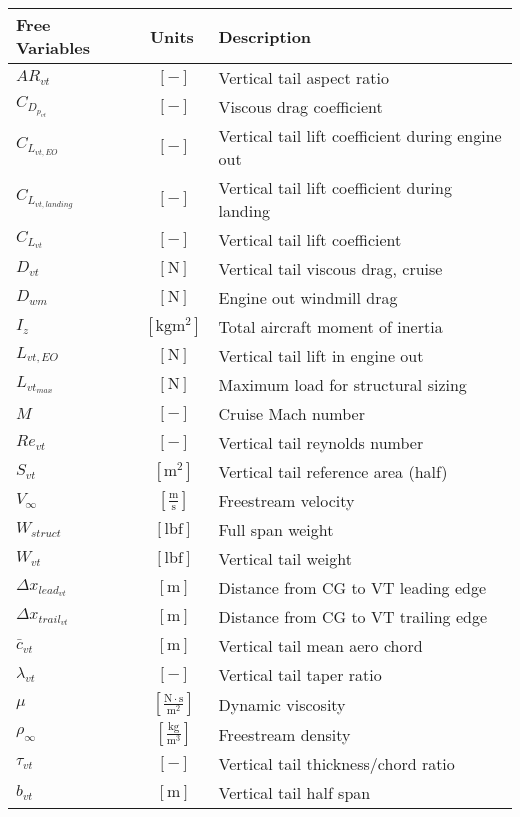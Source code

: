 \documentclass[12pt]{article}
\begin{document}
{\footnotesize
\begin{supertabular}{lcl}
\toprule
Free Variables & Units & Description \\ \midrule
$AR_{vt}$ & $~[-]$ & Vertical tail aspect ratio \\
$C_{D_{p_{vt}}}$ & $~[-]$ & Viscous drag coefficient \\
$C_{L_{vt,EO}}$ & $~[-]$ & Vertical tail lift coefficient during engine out \\
$C_{L_{vt,landing}}$ & $~[-]$ & Vertical tail lift coefficient during landing \\
$C_{L_{vt}}$ & $~[-]$ & Vertical tail lift coefficient \\
$D_{vt}$ & $~\mathrm{[N]}$ & Vertical tail viscous drag, cruise \\
$D_{wm}$ & $~\mathrm{[N]}$ & Engine out windmill drag \\
$I_{z}$ & $~\mathrm{[kg m^2]}$ & Total aircraft moment of inertia\\
$L_{vt,EO}$ & $~\mathrm{[N]}$ & Vertical tail lift in engine out \\
$L_{vt_{max}}$ & $~\mathrm{[N]}$ & Maximum load for structural sizing \\
$M$ & $~[-]$ & Cruise Mach number \\
$Re_{vt}$ & $~[-]$ & Vertical tail reynolds number\\
$S_{vt}$ & $~\mathrm{[m^{2}]}$ & Vertical tail reference area (half) \\
$V_{\infty}$ & $~\mathrm{[\tfrac{m}{s}]}$ & Freestream velocity \\
$W_{struct}$ & $~\mathrm{[lbf]}$ & Full span weight \\
$W_{vt}$ & $~\mathrm{[lbf]}$ & Vertical tail weight \\
$\Delta x_{lead_{vt}}$ & $~\mathrm{[m]}$ & Distance from CG to VT leading edge \\
$\Delta x_{trail_{vt}}$ & $~\mathrm{[m]}$ & Distance from CG to VT trailing edge \\
$\bar{c}_{vt}$ & $~\mathrm{[m]}$ & Vertical tail mean aero chord \\
$\lambda_{vt}$ & $~[-]$ & Vertical tail taper ratio \\
$\mu$ & $~\mathrm{[\tfrac{N\cdot s}{m^{2}}]}$ & Dynamic viscosity \\
$\rho_{\infty}$ & $~\mathrm{[\tfrac{kg}{m^{3}}]}$ & Freestream density\\
$\tau_{vt}$ & $~[-]$ & Vertical tail thickness/chord ratio \\
$b_{vt}$ & $~\mathrm{[m]}$ & Vertical tail half span \\

\end{supertabular}}
\end{document}
